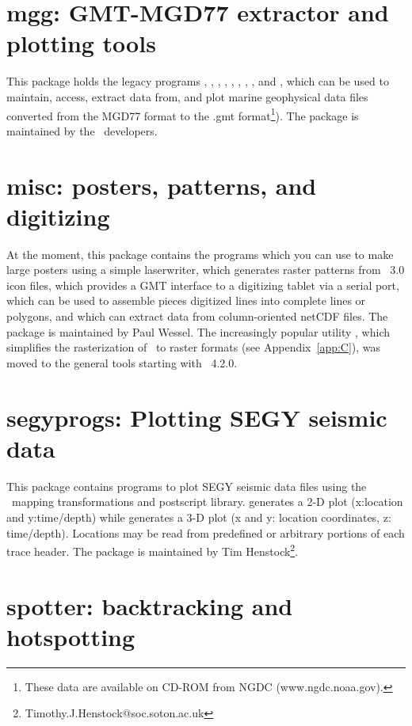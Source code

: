 \section{mgg: GMT-MGD77 extractor and plotting tools}

This package holds the legacy programs , ,
, , , ,
, , and , which can be
used to maintain, access, extract data from, and plot marine geophysical
data files converted from the MGD77 format to the .gmt format\footnote{These data are available on CD-ROM from NGDC
(www.ngdc.noaa.gov).}). The package is maintained by the \GMT\ developers.

\section{misc: posters, patterns, and digitizing}

At the moment, this package contains the programs 
which you can use to make large posters using a simple laserwriter,
 which generates raster patterns from \GMT\ 3.0
icon files,  which provides a GMT interface
to a digitizing tablet via a serial port,  which can
be used to assemble pieces digitized lines into complete lines or
polygons,
and  which can extract data from column-oriented netCDF files.
The package is maintained by Paul Wessel.
The increasingly popular utility , which simplifies the rasterization of \GMT
\PS\ to raster formats (see Appendix~\ref{app:C}), was moved to the general tools starting with \GMT\ 4.2.0.

\section{segyprogs: Plotting SEGY seismic data}

This package contains programs to plot SEGY seismic data files using
the \GMT\ mapping transformations and postscript library.  generates
a 2-D plot (x:location and y:time/depth) while  generates a
3-D plot (x and y: location coordinates, z: time/depth). Locations may be
read from predefined or arbitrary portions of each trace header.
The package is maintained by Tim Henstock\footnote{Timothy.J.Henstock@soc.soton.ac.uk}.

\section{spotter: backtracking and hotspotting}

